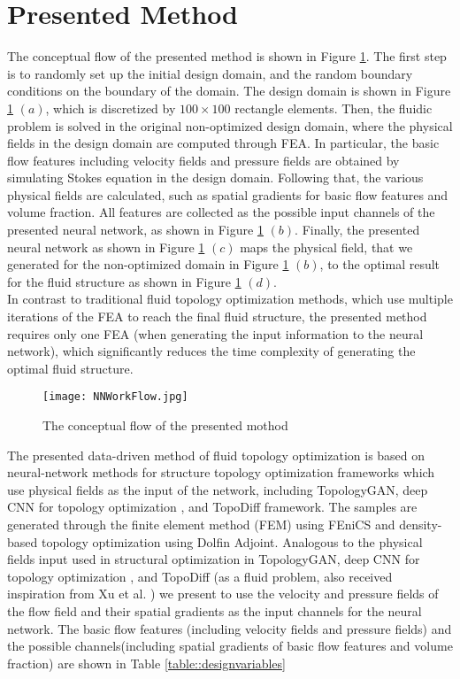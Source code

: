 \documentclass{article}
\begin{document}
\section{Presented Method \label{Sec::Methods}}
The conceptual flow of the presented method is shown in Figure \ref{fig::NN}.  The first step is to randomly set up the initial design domain, and the random boundary conditions on the boundary of the domain. The design domain is shown in Figure \ref{fig::NN} $(a)$, which is discretized by $100 \times 100$ rectangle elements. Then, the fluidic problem is solved in the original non-optimized design domain,  where the physical fields in the design domain are computed through FEA. In particular, the basic flow features including velocity fields and pressure fields are obtained  by simulating Stokes equation in the design domain. Following that, the various physical fields are calculated, such as spatial gradients for basic flow features and volume fraction. All features are collected as the possible input channels of the presented neural network, as shown in Figure \ref{fig::NN} $(b)$.
Finally, the presented neural network as shown in Figure \ref{fig::NN} $(c)$ maps the physical field, that we generated for the non-optimized domain in Figure \ref{fig::NN} $(b)$, to the optimal result for the fluid structure as shown in Figure \ref{fig::NN} $(d)$.\\
In contrast to traditional fluid topology optimization methods, which use multiple iterations of the FEA to reach the final fluid structure, the presented method requires only one FEA (when generating the input information to the neural network), which significantly reduces the time complexity of generating the optimal fluid structure.
\begin{figure}
    \centering
    \texttt{[image: NNWorkFlow.jpg]}
    \caption{The conceptual flow of the presented mothod}
    \label{fig::NN}
\end{figure}
The presented data-driven method of fluid topology optimization is based on neural-network methods for structure topology optimization frameworks which use physical fields as the input of the network, including TopologyGAN\cite{1-TopoGAN-nie2021topologygan}, deep CNN for topology optimization \cite{3-TopoCNN-wang2022deep}, and TopoDiff\cite{6-9-maze2022diffusion} framework. The samples are generated through the finite element method (FEM) using FEniCS and density-based topology optimization using Dolfin Adjoint\cite{2-mitusch2019dolfin}. Analogous to the physical fields input used in structural optimization in TopologyGAN\cite{1-TopoGAN-nie2021topologygan}, deep CNN for topology optimization \cite{3-TopoCNN-wang2022deep}, and TopoDiff\cite{6-9-maze2022diffusion} (as a fluid problem, also received inspiration from Xu et al. \cite{8-1-xu2021machine}) we present to use the velocity and pressure fields of the flow field and their spatial gradients as the input channels for the neural network. The basic flow features (including velocity fields and pressure fields) and the possible channels(including spatial gradients of basic flow features and volume fraction) are shown in Table \ref{table::designvariables}\\
\end{document}
